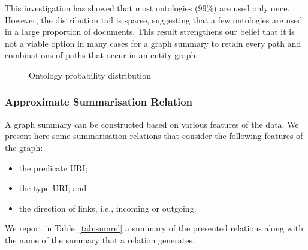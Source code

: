 This investigation has showed that most ontologies (99\%) are used only once. However, the distribution tail is sparse, suggesting that a few ontologies are used in a large proportion of documents.
This result strengthens our belief that it is not a viable option in many cases for a graph summary to retain every path and combinations of paths that occur in an entity graph.

\begin{figure}
	\centering
	
	\caption{Ontology probability distribution}
	\label{fig:onto-dist}
\end{figure}


\subsubsection{Approximate Summarisation Relation}

A graph summary can be constructed based on various features of the data. We present here some summarisation relations that consider the following features of the graph:
\begin{itemize}
	\item the predicate URI;
	\item the type URI; and
	\item the direction of links, i.e., incoming or outgoing.
\end{itemize}
We report in Table~\ref{tab:sumrel} a summary of the presented relations along with the name of the summary that a relation generates.

